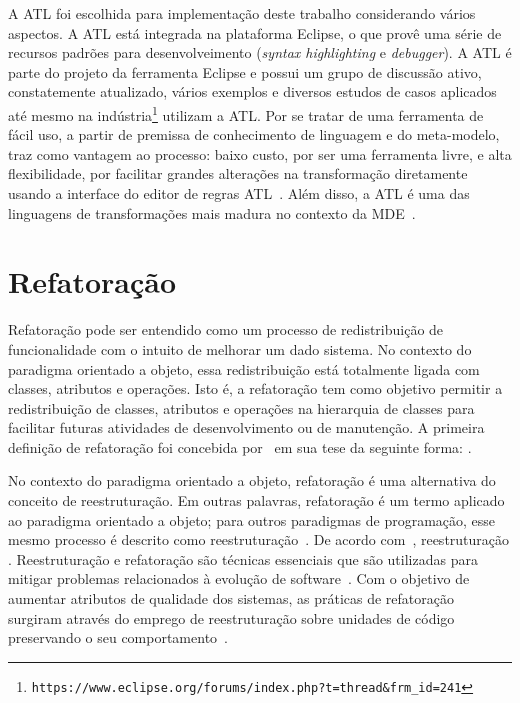 A ATL foi escolhida para implementação deste trabalho considerando vários aspectos. A ATL está integrada na plataforma Eclipse, o que provê uma série de recursos padrões para desenvolveimento (\textit{syntax highlighting} e \textit{debugger}). A ATL é parte do projeto  da ferramenta Eclipse e possui um grupo de discussão ativo, constatemente atualizado, vários exemplos e diversos estudos de casos aplicados até mesmo na indústria\footnote{\texttt{https://www.eclipse.org/forums/index.php?t=thread&frm_id=241}} utilizam a ATL. Por se tratar de uma ferramenta de fácil uso, a partir de premissa de conhecimento de linguagem e do meta-modelo, traz como vantagem ao processo: baixo custo, por ser uma ferramenta livre, e alta flexibilidade, por facilitar grandes alterações na transformação diretamente usando a interface do editor de regras ATL~\cite{Salem_2008}. Além disso, a ATL é uma das linguagens de transformações mais madura no contexto da MDE~\cite{bruneliere_2010}.

\section{Refatoração}\label{sec:refatoracao}


Refatoração pode ser entendido como um processo de redistribuição de funcionalidade com o intuito de melhorar um dado sistema. No contexto do paradigma orientado a objeto, essa redistribuição está totalmente ligada com classes, atributos e operações. Isto é, a refatoração tem como objetivo permitir a redistribuição de classes, atributos e operações na hierarquia de classes para facilitar futuras atividades de desenvolvimento ou de manutenção. A primeira definição de refatoração foi concebida por~ em sua tese da seguinte forma: .

No contexto do paradigma orientado a objeto, refatoração é uma alternativa do conceito de reestruturação. Em outras palavras, refatoração é um termo aplicado ao paradigma orientado a objeto; para outros paradigmas de programação, esse mesmo processo é descrito como reestruturação~\cite{Chikofsky_cross}. De acordo com~, reestruturação . Reestruturação e refatoração são técnicas essenciais que são utilizadas para mitigar problemas relacionados à evolução de software~\cite{OPDYKE_1992}. Com o objetivo de aumentar atributos de qualidade dos sistemas, as práticas de refatoração surgiram através do emprego de reestruturação sobre unidades de código preservando o seu comportamento~\cite{Chikofsky_cross,OPDYKE_1992}.

